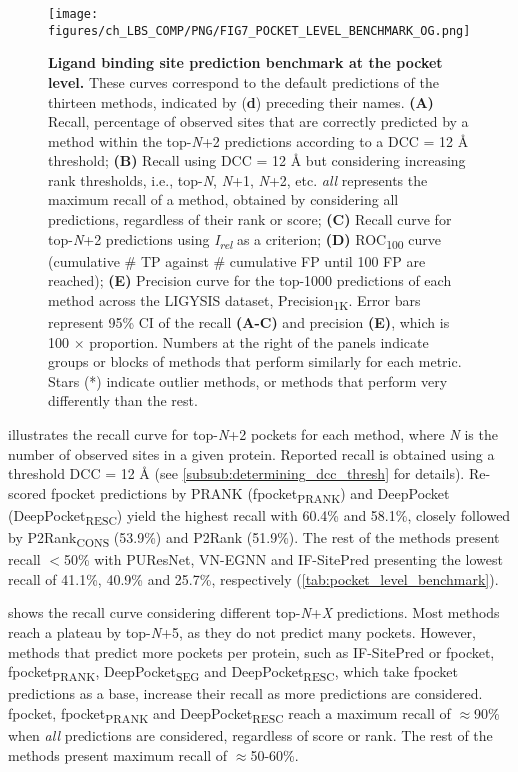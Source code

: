 \begin{figure}[ht!]
    \centering
    \texttt{[image: figures/ch\_LBS\_COMP/PNG/FIG7\_POCKET\_LEVEL\_BENCHMARK\_OG.png]}
    \caption[Ligand binding site prediction benchmark at the pocket level]{\textbf{Ligand binding site prediction benchmark at the pocket level.} These curves correspond to the default predictions of the thirteen methods, indicated by (\textbf{d}) preceding their names. \textbf{(A)} Recall, percentage of observed sites that are correctly predicted by a method within the top-\textit{N}+2 predictions according to a DCC = 12 \AA{} threshold; \textbf{(B)} Recall using DCC = 12 \AA{} but considering increasing rank thresholds, i.e., top-\textit{N}, \textit{N}+1, \textit{N}+2, etc. \textit{all} represents the maximum recall of a method, obtained by considering all predictions, regardless of their rank or score; \textbf{(C)} Recall curve for top-\textit{N}+2 predictions using \textit{I\textsubscript{rel}} as a criterion; \textbf{(D)} ROC\textsubscript{100} curve (cumulative \# TP against \# cumulative FP until 100 FP are reached); \textbf{(E)} Precision curve for the top-1000 predictions of each method across the LIGYSIS dataset, Precision\textsubscript{1K}. Error bars represent 95\% CI of the recall \textbf{(A-C)} and precision \textbf{(E)}, which is 100 $\times$ proportion. Numbers at the right of the panels indicate groups or blocks of methods that perform similarly for each metric. Stars (*) indicate outlier methods, or methods that perform very differently than the rest.}
    \label{fig:pocket_level_benchmark_OG}
\end{figure}

 illustrates the recall curve for top-\textit{N}+2 pockets for each method, where \textit{N} is the number of observed sites in a given protein. Reported recall is obtained using a threshold DCC = 12 \AA{} (see \autoref{subsub:determining_dcc_thresh} for details). Re-scored fpocket predictions by PRANK (fpocket\textsubscript{PRANK}) and DeepPocket (DeepPocket\textsubscript{RESC}) yield the highest recall with 60.4\% and 58.1\%, closely followed by P2Rank\textsubscript{CONS} (53.9\%) and P2Rank (51.9\%). The rest of the methods present recall $<$50\% with PUResNet, VN-EGNN and IF-SitePred presenting the lowest recall of 41.1\%, 40.9\% and 25.7\%, respectively (\autoref{tab:pocket_level_benchmark}).

 shows the recall curve considering different top-\textit{N}+\textit{X} predictions. Most methods reach a plateau by top-\textit{N}+5, as they do not predict many pockets. However, methods that predict more pockets per protein, such as IF-SitePred or fpocket, fpocket\textsubscript{PRANK}, DeepPocket\textsubscript{SEG} and DeepPocket\textsubscript{RESC}, which take fpocket predictions as a base, increase their recall as more predictions are considered. fpocket, fpocket\textsubscript{PRANK} and DeepPocket\textsubscript{RESC} reach a maximum recall of $\approx$90\% when \textit{all} predictions are considered, regardless of score or rank. The rest of the methods present maximum recall of $\approx$50-60\%.

